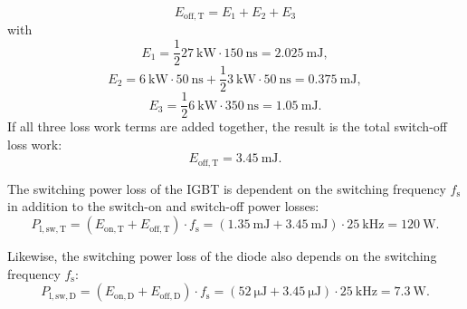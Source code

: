 \begin{solutionblock}
\begin{equation}
E_{\mathrm{off,T}} = E_{\mathrm{1}} + E_{\mathrm{2}} + E_{\mathrm{3}}
\end{equation}
with
\begin{equation}
E_{\mathrm{1}} = \frac{1}{2} \SI{27}{\kilo\watt} \cdot \SI{150}{\ns} = \SI {2.025}{\milli\joule},
\end{equation}
\begin{equation}
E_{\mathrm{2}} = \SI{6}{\kilo\watt} \cdot \SI{50}{\ns} + \frac{1}{2} \SI{3}{\kilo\watt} \cdot \SI{50}{\ns} = \SI {0.375}{\milli\joule},
\end{equation}
\begin{equation}
    E_{\mathrm{3}} = \frac{1}{2} \SI{6}{\kilo\watt} \cdot \SI{350}{\ns} = \SI {1.05}{\milli\joule}.
    \end{equation}
If all three loss work terms are added together, the result is the total switch-off loss work:
\begin{equation}
    E_{\mathrm{off,T}} =  \SI {3.45}{\milli\joule}.
\end{equation}

    

\end{solutionblock}


\begin{solutionblock}
The switching power loss of the IGBT is dependent on the switching frequency $f_{\mathrm{s}}$ in addition to the switch-on and switch-off power losses:
\begin{equation}
    P_{\mathrm{l,sw,T}} =  (E_{\mathrm{on,T}} +  E_{\mathrm{off,T}}) \cdot f_{\mathrm{s}} = (\SI {1.35}{\milli\joule} + \SI {3.45}{\milli\joule}) \cdot \SI {25}{\kilo\hertz} = \SI {120}{\watt}.
 \end{equation}

 Likewise, the switching power loss of the diode also depends on the switching frequency $f_{\mathrm{s}}$:
 \begin{equation}
    P_{\mathrm{l,sw,D}} =  (E_{\mathrm{on,D}} +  E_{\mathrm{off,D}}) \cdot f_{\mathrm{s}} = (\SI {52}{\micro\joule} + \SI {3.45}{\micro\joule}) \cdot \SI {25}{\kilo\hertz} = \SI {7.3}{\watt}.
 \end{equation}
\end{solutionblock}

